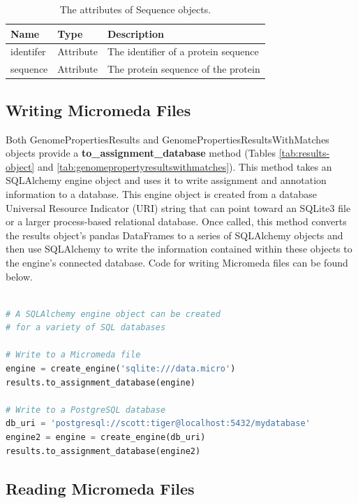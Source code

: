 \begin{table}[!ht]
\centering
\caption{The attributes of Sequence objects.}
\label{tab:sequenceobject}
\begin{tabular}{|p{2.7cm}|p{2cm}|p{10cm}|}
\hline
\textbf{Name} & \textbf{Type} & \textbf{Description} \\ \hline
identifer & Attribute & The identifier of a protein sequence \\ \hline
sequence & Attribute & The protein sequence of the protein \\ \hline
\end{tabular}
\end{table}

\subsection{Writing Micromeda Files}

Both GenomePropertiesResults and GenomePropertiesResultsWithMatches objects provide a \textbf{to\_assignment\_database} method (Tables \ref{tab:results-object} and \ref{tab:genomepropertyresultswithmatches}). This method takes an SQLAlchemy engine object and uses it to write assignment and annotation information to a database. This engine object is created from a database Universal Resource Indicator (URI) \cite{berners1998uniform} string that can point toward an SQLite3 file or a larger process-based relational database. Once called, this method converts the results object's pandas DataFrames to a series of SQLAlchemy objects and then use SQLAlchemy to write the information contained within these objects to the engine's connected database. Code for writing Micromeda files can be found below.

\begin{lstlisting}[language=Python]  

# A SQLAlchemy engine object can be created
# for a variety of SQL databases

# Write to a Micromeda file
engine = create_engine('sqlite:///data.micro')
results.to_assignment_database(engine)

# Write to a PostgreSQL database
db_uri = 'postgresql://scott:tiger@localhost:5432/mydatabase'
engine2 = engine = create_engine(db_uri)
results.to_assignment_database(engine2)

\end{lstlisting}

\subsection{Reading Micromeda Files}

